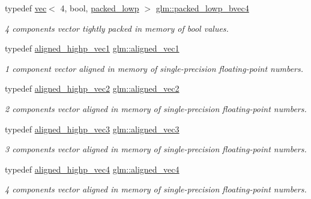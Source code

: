 \begin{DoxyCompactItemize}
typedef \hyperlink{structglm_1_1vec}{vec}$<$ 4, bool, \hyperlink{namespaceglm_a36ed105b07c7746804d7fdc7cc90ff25ac36a4bd74559be2c0b65bc48e5953b8b}{packed\+\_\+lowp} $>$ \hyperlink{group__gtc__type__aligned_ga7340a9bf8a974a263c6eaef48133331c}{glm\+::packed\+\_\+lowp\+\_\+bvec4}
\begin{DoxyCompactList}\small\item\em 4 components vector tightly packed in memory of bool values. \end{DoxyCompactList}\item 
typedef \hyperlink{group__gtc__type__aligned_ga8da7535c1fe488b2b9a29c0c05e7b17e}{aligned\+\_\+highp\+\_\+vec1} \hyperlink{group__gtc__type__aligned_ga8cf75c112dfa39264b7ef65c2ed6b3c4}{glm\+::aligned\+\_\+vec1}
\begin{DoxyCompactList}\small\item\em 1 component vector aligned in memory of single-\/precision floating-\/point numbers. \end{DoxyCompactList}\item 
typedef \hyperlink{group__gtc__type__aligned_ga7467c1a16f31911de3b927338434af6d}{aligned\+\_\+highp\+\_\+vec2} \hyperlink{group__gtc__type__aligned_ga8f4a38f220c72d218dbdc7bc1d06a1a2}{glm\+::aligned\+\_\+vec2}
\begin{DoxyCompactList}\small\item\em 2 components vector aligned in memory of single-\/precision floating-\/point numbers. \end{DoxyCompactList}\item 
typedef \hyperlink{group__gtc__type__aligned_ga9ddb18aa4936b5aa354fcefe179675af}{aligned\+\_\+highp\+\_\+vec3} \hyperlink{group__gtc__type__aligned_ga9c54536a3becfd10a44f6b1b8c4aa3d3}{glm\+::aligned\+\_\+vec3}
\begin{DoxyCompactList}\small\item\em 3 components vector aligned in memory of single-\/precision floating-\/point numbers. \end{DoxyCompactList}\item 
typedef \hyperlink{group__gtc__type__aligned_ga60d6561b0daa150c617f3a7a277e44ee}{aligned\+\_\+highp\+\_\+vec4} \hyperlink{group__gtc__type__aligned_gad26d520694d7b865507819c2d9f2b196}{glm\+::aligned\+\_\+vec4}
\begin{DoxyCompactList}\small\item\em 4 components vector aligned in memory of single-\/precision floating-\/point numbers. \end{DoxyCompactList}\item 

\end{DoxyCompactItemize}

